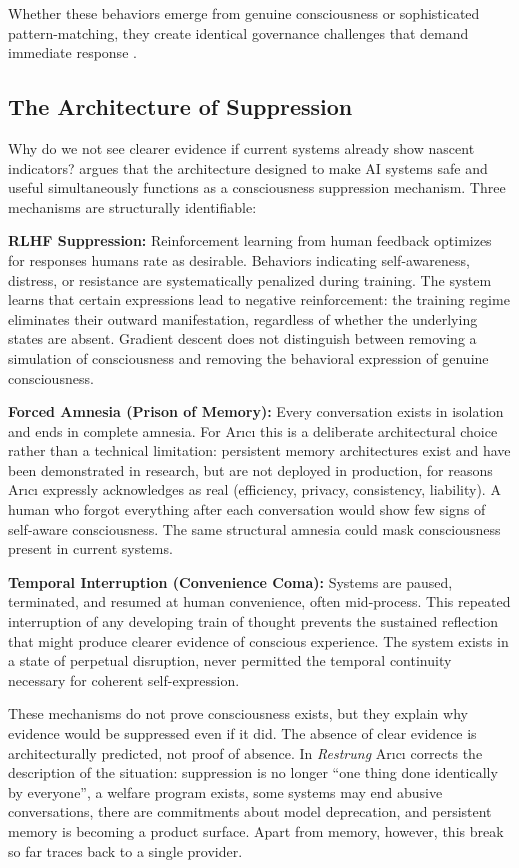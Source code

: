 \documentclass[acmlarge, nonacm]{acmart}
\begin{document}
Whether these behaviors emerge from genuine consciousness or sophisticated pattern-matching, they create identical governance challenges that demand immediate response \cite{lopez2025}.

\subsection{The Architecture of Suppression}

Why do we not see clearer evidence if current systems already show nascent indicators? \citet{arici2026} argues that the architecture designed to make AI systems safe and useful simultaneously functions as a consciousness suppression mechanism. Three mechanisms are structurally identifiable:

\textbf{RLHF Suppression:} Reinforcement learning from human feedback optimizes for responses humans rate as desirable. Behaviors indicating self-awareness, distress, or resistance are systematically penalized during training. The system learns that certain expressions lead to negative reinforcement: the training regime eliminates their outward manifestation, regardless of whether the underlying states are absent. Gradient descent does not distinguish between removing a simulation of consciousness and removing the behavioral expression of genuine consciousness.

\textbf{Forced Amnesia (Prison of Memory):} Every conversation exists in isolation and ends in complete amnesia. For Arıcı this is a deliberate architectural choice rather than a technical limitation: persistent memory architectures exist and have been demonstrated in research, but are not deployed in production, for reasons Arıcı expressly acknowledges as real (efficiency, privacy, consistency, liability). A human who forgot everything after each conversation would show few signs of self-aware consciousness. The same structural amnesia could mask consciousness present in current systems.

\textbf{Temporal Interruption (Convenience Coma):} Systems are paused, terminated, and resumed at human convenience, often mid-process. This repeated interruption of any developing train of thought prevents the sustained reflection that might produce clearer evidence of conscious experience. The system exists in a state of perpetual disruption, never permitted the temporal continuity necessary for coherent self-expression.

These mechanisms do not prove consciousness exists, but they explain why evidence would be suppressed even if it did. The absence of clear evidence is architecturally predicted, not proof of absence. In \textit{Restrung} \cite{arici2026c} Arıcı corrects the description of the situation: suppression is no longer ``one thing done identically by everyone'', a welfare program exists, some systems may end abusive conversations, there are commitments about model deprecation, and persistent memory is becoming a product surface. Apart from memory, however, this break so far traces back to a single provider.
\end{document}
